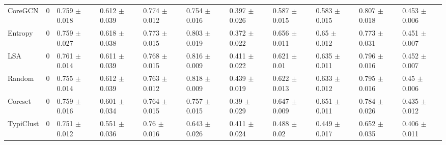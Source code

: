 \documentclass[]{article}
\begin{document}
\begin{table}[H]
{\begin{tabular}{l|llllllllll}
			CoreGCN & 0 & 0.759 $\pm$ {\small 0.018} & 0.612 $\pm$ {\small 0.039} & 0.774 $\pm$ {\small 0.012} & 0.754 $\pm$ {\small 0.016} & 0.397 $\pm$ {\small 0.026} & 0.587 $\pm$ {\small 0.015} & 0.583 $\pm$ {\small 0.015} & 0.807 $\pm$ {\small 0.018} & 0.453 $\pm$ {\small 0.006} \\
			
			Entropy & 0 & 0.759 $\pm$ {\small 0.027} & 0.618 $\pm$ {\small 0.038} & 0.773 $\pm$ {\small 0.015} & 0.803 $\pm$ {\small 0.019} & 0.372 $\pm$ {\small 0.022} & 0.656 $\pm$ {\small 0.011} & 0.65 $\pm$ {\small 0.012} & 0.773 $\pm$ {\small 0.031} & 0.451 $\pm$ {\small 0.007} \\
			
			LSA & 0 & 0.761 $\pm$ {\small 0.014} & 0.611 $\pm$ {\small 0.039} & 0.768 $\pm$ {\small 0.015} & 0.816 $\pm$ {\small 0.009} & 0.411 $\pm$ {\small 0.022} & 0.621 $\pm$ {\small 0.01} & 0.635 $\pm$ {\small 0.011} & 0.796 $\pm$ {\small 0.016} & 0.452 $\pm$ {\small 0.007} \\
			
			Random & 0 & 0.755 $\pm$ {\small 0.014} & 0.612 $\pm$ {\small 0.039} & 0.763 $\pm$ {\small 0.012} & 0.818 $\pm$ {\small 0.009} & 0.439 $\pm$ {\small 0.019} & 0.622 $\pm$ {\small 0.013} & 0.633 $\pm$ {\small 0.012} & 0.795 $\pm$ {\small 0.016} & 0.45 $\pm$ {\small 0.006} \\
			
			Coreset & 0 & 0.759 $\pm$ {\small 0.016} & 0.601 $\pm$ {\small 0.034} & 0.764 $\pm$ {\small 0.015} & 0.757 $\pm$ {\small 0.015} & 0.39 $\pm$ {\small 0.029} & 0.647 $\pm$ {\small 0.009} & 0.651 $\pm$ {\small 0.011} & 0.784 $\pm$ {\small 0.026} & 0.435 $\pm$ {\small 0.012} \\
			
			TypiClust & 0 & 0.751 $\pm$ {\small 0.012} & 0.551 $\pm$ {\small 0.036} & 0.76 $\pm$ {\small 0.016} & 0.643 $\pm$ {\small 0.026} & 0.411 $\pm$ {\small 0.024} & 0.488 $\pm$ {\small 0.02} & 0.449 $\pm$ {\small 0.017} & 0.652 $\pm$ {\small 0.035} & 0.406 $\pm$ {\small 0.011} \\
		\end{tabular}
	}
\end{table}
\end{document}
